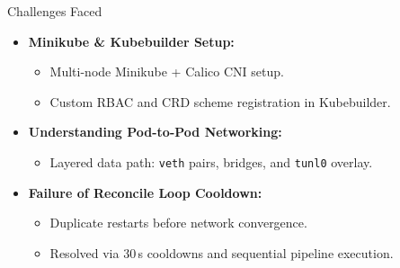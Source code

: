 \documentclass[aspectratio=169, 11pt]{beamer}
\begin{document}
\begin{frame}{Challenges Faced}
\footnotesize

\begin{itemize}
  \item \textbf{Minikube \& Kubebuilder Setup:}
  \begin{itemize}\footnotesize
    \item Multi-node Minikube + Calico CNI setup.
    \item Custom RBAC and CRD scheme registration in Kubebuilder.
  \end{itemize}

  \vspace{6pt}
  \item \textbf{Understanding Pod-to-Pod Networking:}
  \begin{itemize}\footnotesize
    \item Layered data path: \texttt{veth} pairs, bridges, and \texttt{tunl0} overlay.
  \end{itemize}

  \vspace{6pt}
  \item \textbf{Failure of Reconcile Loop Cooldown:}
  \begin{itemize}\footnotesize
    \item Duplicate restarts before network convergence.
    \item Resolved via 30\,s cooldowns and sequential pipeline execution.
  \end{itemize}
\end{itemize}

\end{frame}


\end{document}
